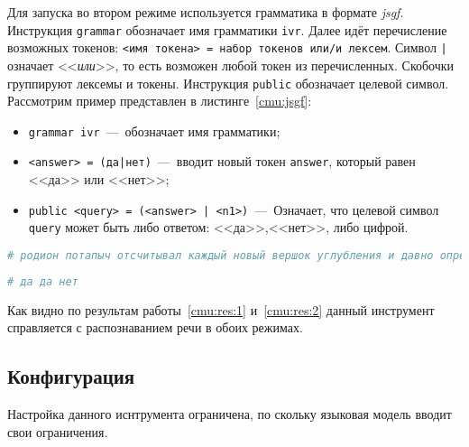 Для запуска во втором режиме используется грамматика в формате \textit{jsgf}.
Инструкция \texttt{grammar} обозначает имя грамматики \texttt{ivr}. Далее
идёт перечисление возможных токенов: \texttt{<имя токена> = набор токенов или/и лексем}.
Символ \texttt{|} означает <<\textit{или}>>, то есть возможен любой токен из перечисленных.
Скобочки группируют лексемы и токены. Инструкция \texttt{public} обозначает целевой символ.
Рассмотрим пример представлен в листинге~\ref{cmu:jsgf}:
\begin{itemize}
    \item \texttt{grammar ivr}~---~обозначает имя грамматики;
    \item \texttt{<answer> = (да|нет)}~---~вводит новый токен \texttt{answer},
    который равен <<да>> или <<нет>>;
    \item \texttt{public <query> = (<answer> | <n1>)}~---~Означает, что целевой
        символ \texttt{query} может быть либо ответом: <<да>>,<<нет>>, либо цифрой.
\end{itemize}

\begin{lstlisting}[caption={Результат запуска 1 версии},label={cmu:res:1}, language=bash]
# родион потапыч отсчитывал каждый новый вершок углубления и давно определил про себя
\end{lstlisting}

\begin{lstlisting}[caption={Результат запуска 2 версии},label={cmu:res:2},language=bash]
# да да нет
\end{lstlisting}

Как видно по результам работы~\ref{cmu:res:1} и~\ref{cmu:res:2} данный инструмент
справляется с распознаванием речи в обоих режимах.
\subsection{Конфигурация}

Настройка данного иснтрумента ограничена, по скольку языковая модель вводит свои
ограничения.
